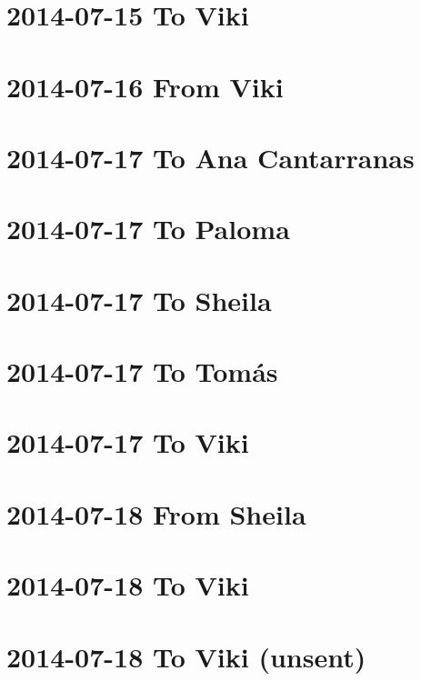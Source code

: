 \documentclass[]{book}
\begin{document}
\hypertarget{to-viki}{%
\section{2014-07-15 To Viki}\label{to-viki}}

\hypertarget{from-viki}{%
\section{2014-07-16 From Viki}\label{from-viki}}

\hypertarget{to-ana-cantarranas}{%
\section{2014-07-17 To Ana Cantarranas}\label{to-ana-cantarranas}}

\hypertarget{to-paloma-4}{%
\section{2014-07-17 To Paloma}\label{to-paloma-4}}

\hypertarget{to-sheila-3}{%
\section{2014-07-17 To Sheila}\label{to-sheila-3}}

\hypertarget{to-tomas-9}{%
\section{2014-07-17 To Tomás}\label{to-tomas-9}}

\hypertarget{to-viki-1}{%
\section{2014-07-17 To Viki}\label{to-viki-1}}

\hypertarget{from-sheila-2}{%
\section{2014-07-18 From Sheila}\label{from-sheila-2}}

\hypertarget{to-viki-2}{%
\section{2014-07-18 To Viki}\label{to-viki-2}}

\hypertarget{to-viki-unsent}{%
\section{2014-07-18 To Viki (unsent)}\label{to-viki-unsent}}
\end{document}
